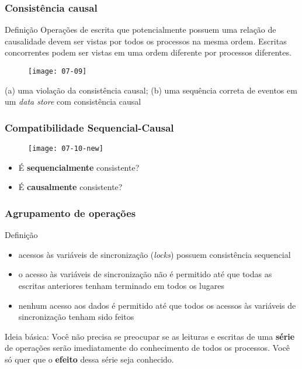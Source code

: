 \documentclass[Ligatures=TeX,table,brazil,svgnames,usetotalslideindicator,compress,10pt]{beamer}
\begin{document}
\begin{frame}
  \frametitle{Consistência causal}
  \begin{block}{Definição}
    Operações de escrita que potencialmente possuem uma relação de causalidade devem ser vistas por todos os processos na mesma ordem. Escritas concorrentes podem ser vistas em uma ordem diferente por processos diferentes.
  \end{block}

  \begin{figure}
    \centering
    \texttt{[image: 07-09]}
  \end{figure}

  \small
  (a) uma violação da consistência causal; (b) uma sequência correta de eventos em um \textit{data store} com consistência causal

\end{frame}

\begin{frame}
  \frametitle{Compatibilidade Sequencial-Causal}
  \begin{figure}[ht]
    \centering
    \texttt{[image: 07-10-new]}
  \end{figure}
  \begin{itemize}
  \item É \textbf{sequencialmente} consistente?
  \item É \textbf{causalmente} consistente?
  \end{itemize}
\end{frame}


\begin{frame}
  \frametitle{Agrupamento de operações}
  \begin{block}{Definição}
    \begin{itemize}
    \item acessos às \alert{variáveis de sincronização} (\textit{locks}) possuem consistência sequencial
    \item o acesso às variáveis de sincronização não é permitido até que todas as escritas anteriores tenham terminado em todos os lugares
    \item nenhum acesso aos dados é permitido até que todos os acessos às variáveis de sincronização tenham sido feitos
    \end{itemize}
  \end{block}

  \begin{block}{Ideia básica:}
    Você não precisa se preocupar se as leituras e escritas de uma
    \textbf{série} de operações serão imediatamente do conhecimento de
    todos os processos. Você só quer que o \textbf{efeito} dessa série
    seja conhecido.
  \end{block}
\end{frame}
\end{document}
